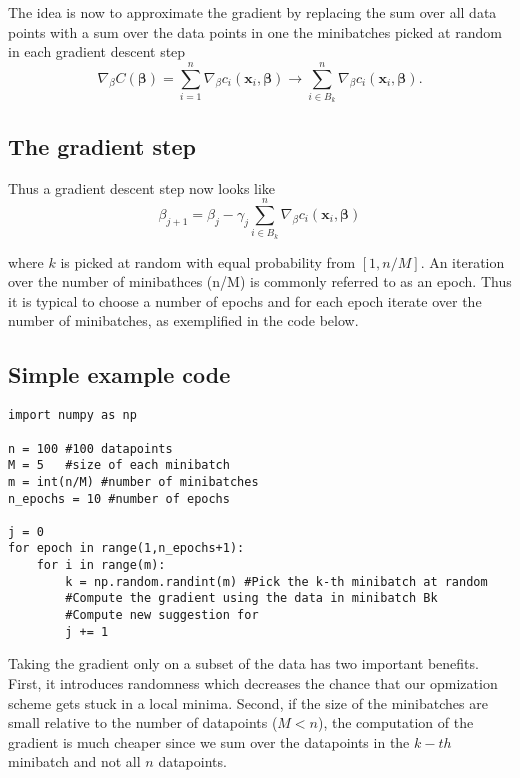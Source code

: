 \documentclass[%
oneside,                 %
final,                   %
10pt]{article}
\begin{document}
The idea is now to approximate the gradient by replacing the sum over
all data points with a sum over the data points in one the minibatches
picked at random in each gradient descent step 
\[
\nabla_{\beta}
C(\mathbf{\beta}) = \sum_{i=1}^n \nabla_\beta c_i(\mathbf{x}_i,
\mathbf{\beta}) \rightarrow \sum_{i \in B_k}^n \nabla_\beta
c_i(\mathbf{x}_i, \mathbf{\beta}).
\]

\subsection*{The gradient step}

Thus a gradient descent step now looks like 
\[
\beta_{j+1} = \beta_j - \gamma_j \sum_{i \in B_k}^n \nabla_\beta c_i(\mathbf{x}_i,
\mathbf{\beta})
\]

where $k$ is picked at random with equal
probability from $[1,n/M]$. An iteration over the number of
minibathces (n/M) is commonly referred to as an epoch. Thus it is
typical to choose a number of epochs and for each epoch iterate over
the number of minibatches, as exemplified in the code below.

\subsection*{Simple example code}

\begin{verbatim}
import numpy as np 

n = 100 #100 datapoints 
M = 5   #size of each minibatch
m = int(n/M) #number of minibatches
n_epochs = 10 #number of epochs

j = 0
for epoch in range(1,n_epochs+1):
    for i in range(m):
        k = np.random.randint(m) #Pick the k-th minibatch at random
        #Compute the gradient using the data in minibatch Bk
        #Compute new suggestion for 
        j += 1
\end{verbatim}

Taking the gradient only on a subset of the data has two important
benefits. First, it introduces randomness which decreases the chance
that our opmization scheme gets stuck in a local minima. Second, if
the size of the minibatches are small relative to the number of
datapoints ($M <  n$), the computation of the gradient is much
cheaper since we sum over the datapoints in the $k-th$ minibatch and not
all $n$ datapoints.
\end{document}
